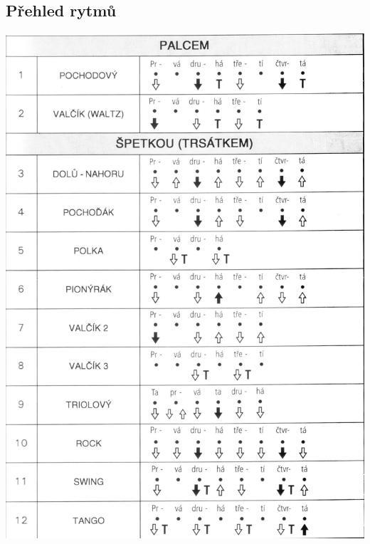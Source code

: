 \documentclass[twoside,12pt,a5paper]{article}
\begin{document}
\begin{center}
\section{Přehled rytmů}
\includegraphics[width=\textwidth]{noty/rytmy} 
\end{center}
\clearpage
\end{document}
